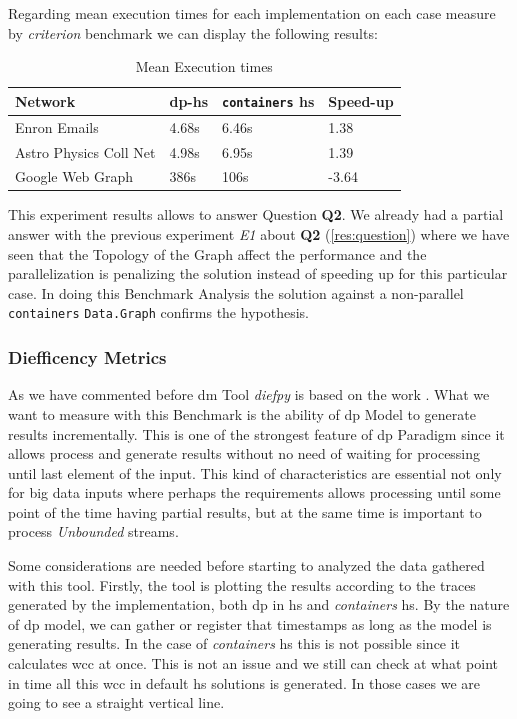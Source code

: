 \documentclass[preprint]{elsarticle}
\begin{document}
Regarding mean execution times for each implementation on each case measure by \emph{criterion} benchmark we can display the following results:

\begin{table}[H]
  \centering
  \begin{tabular}{|l|l|l|l|}
   \hline
   \textbf{Network} & \textbf{\acrshort{dp}-\acrshort{hs}} & \textbf{\texttt{containers} \acrshort{hs}} & \textbf{Speed-up}\\
   \hline
   Enron Emails & 4.68s &  6.46s & 1.38\\
   \hline
   Astro Physics Coll Net & 4.98s & 6.95s  & 1.39\\
   \hline
   Google Web Graph & 386s & 106s & -3.64\\
   \hline
  \end{tabular}
 \caption{Mean Execution times}
 \label{table:6}
 \end{table}

This experiment results allows to answer Question \textbf{Q2}.
We already had a partial answer with the previous experiment \emph{E1} about \textbf{Q2} (\autoref{res:question}) where we have seen that the Topology of the Graph affect the performance and the parallelization is penalizing the solution instead of speeding up for this particular case. In doing this Benchmark Analysis the solution against a non-parallel \texttt{containers} \texttt{Data.Graph} confirms the hypothesis. 

\subsubsection{Diefficency Metrics}\label{sub:sub:sec:e2}
As we have commented before \acrfull{dm} Tool \emph{diefpy} \cite{diefpy} is based on the work \cite{diefpaper}. What we want to measure with this Benchmark is the ability of \acrshort{dp} Model to generate results incrementally. This is one of the strongest feature of \acrshort{dp} Paradigm since it allows process and generate results without no need of waiting for processing until last element of the input. This kind of characteristics are essential not only for big data inputs where perhaps the requirements allows processing until some point of the time having partial results, but at the same time is important to process \textit{Unbounded} streams. 

Some considerations are needed before starting to analyzed the data gathered with this tool. Firstly, the tool is plotting the results according to the traces generated by the implementation, both \acrshort{dp} in \acrshort{hs} and \emph{containers} \acrshort{hs}. By the nature of \acrshort{dp} model, we can gather or register that timestamps as long as the model is generating results. In the case of \emph{containers} \acrshort{hs} this is not possible since it calculates \acrshort{wcc} at once. This is not an issue and we still can check at what point in time all this \acrshort{wcc} in default \acrshort{hs} solutions is generated. In those cases we are going to see a straight vertical line. 
\end{document}
